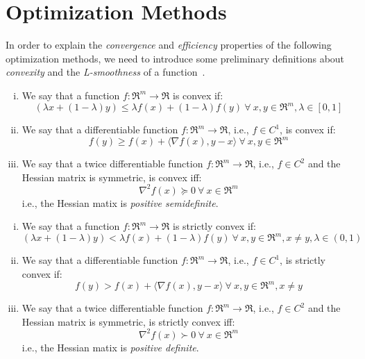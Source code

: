 \section{Optimization Methods}

In order to explain the \emph{convergence} and \emph{efficiency} properties of the following optimization methods, we need to introduce some preliminary definitions about \emph{convexity} and the \emph{L-smoothness} of a function~\cite{boyd2004convex}.

\begin{definition}[Convexity] \label{def:convexity}
	\hfill
	\begin{enumerate}[(i)]
		\item We say that a function $f: \Re^m \rightarrow \Re$ is convex if: 
		$$ 
			(\lambda x + (1 - \lambda) y ) \leq \lambda f(x) + (1 - \lambda) f(y) \ \forall \ x, y \in \Re^m, \lambda \in [0,1] 
		$$
		\item We say that a differentiable function $f: \Re^m \rightarrow \Re$, i.e., $f \in C^1$, is convex if: 
		$$ 
			f(y) \geq f(x) + \langle \nabla f(x), y - x \rangle \ \forall \ x, y \in \Re^m 
		$$
		\item We say that a twice differentiable function $f: \Re^m \rightarrow \Re$, i.e., $f \in C^2$ and the Hessian matrix is symmetric, is convex iff: 
		$$ 
			\nabla^2 f(x) \succeq 0 \ \forall \ x \in \Re^m 
		$$ i.e., the Hessian matix is \emph{positive semidefinite}.
	\end{enumerate}
\end{definition}

\begin{definition} \label{def:strict_convexity}
	\hfill
	\begin{enumerate}[(i)]
		\item We say that a function $f: \Re^m \rightarrow \Re$ is strictly convex if: 
		$$ 
			(\lambda x + (1 - \lambda) y ) < \lambda f(x) + (1 - \lambda) f(y) \ \forall \ x, y \in \Re^m, x \neq y, \lambda \in (0,1) 
		$$
		\item We say that a differentiable function $f: \Re^m \rightarrow \Re$, i.e., $f \in C^1$, is strictly convex if: 
		$$ 
			f(y) > f(x) + \langle \nabla f(x), y - x \rangle \ \forall \ x, y \in \Re^m, x \neq y
		$$
		\item We say that a twice differentiable function $f: \Re^m \rightarrow \Re$, i.e., $f \in C^2$ and the Hessian matrix is symmetric, is strictly convex iff: 
		$$ 
			\nabla^2 f(x) \succ 0 \ \forall \ x \in \Re^m 
		$$ i.e., the Hessian matix is \emph{positive definite}.
	\end{enumerate}
\end{definition}

